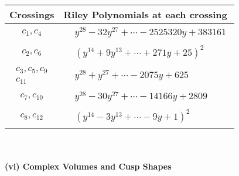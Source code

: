 \documentclass[1p]{elsarticle_modified}
\theoremstyle{definition}
\begin{document}
\begin{tabular}{m{50pt}|m{274pt}}
Crossings & \hspace{64pt}Riley Polynomials at each crossing \\
\hline $$\begin{aligned}c_{1},c_{4}\end{aligned}$$&$\begin{aligned}
&y^{28}-32 y^{27}+\cdots-2525320 y+383161
\end{aligned}$\\
\hline $$\begin{aligned}c_{2},c_{6}\end{aligned}$$&$\begin{aligned}
&(y^{14}+9 y^{13}+\cdots+271 y+25)^{2}
\end{aligned}$\\
\hline $$\begin{aligned}c_{3},c_{5},c_{9}\\c_{11}\end{aligned}$$&$\begin{aligned}
&y^{28}+y^{27}+\cdots-2075 y+625
\end{aligned}$\\
\hline $$\begin{aligned}c_{7},c_{10}\end{aligned}$$&$\begin{aligned}
&y^{28}-30 y^{27}+\cdots-14166 y+2809
\end{aligned}$\\
\hline $$\begin{aligned}c_{8},c_{12}\end{aligned}$$&$\begin{aligned}
&(y^{14}-3 y^{13}+\cdots-9 y+1)^{2}
\end{aligned}$\\
\hline
\end{tabular}\\~\\
\newpage\flushleft \textbf{(vi) Complex Volumes and Cusp Shapes}
\end{document}
